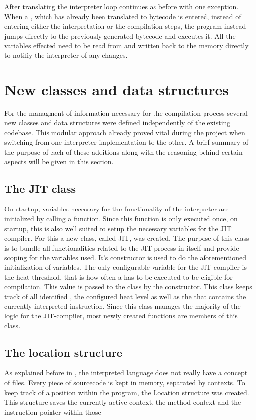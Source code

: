 After translating the interpreter loop continues as before with one exception. When a \bb{}, which has already been translated to bytecode is entered, instead of entering either the interpretation or the compilation steps, the program instead jumps directly to the previously generated bytecode and executes it. All the variables effected need to be read from and written back to the memory directly to notifiy the interpreter of any changes.

\section{New classes and data structures}
For the managment of information necessary for the compilation process several new classes and data structures were defined independently of the existing codebase. This modular approach already proved vital during the project when switching from one interpreter implementation to the other. A brief summary of the purpose of each of these additions along with the reasoning behind certain aspects will be given in this section.

\subsection{The JIT class}
On startup, variables necessary for the functionality of the interpreter are initialized by calling a function. Since this function is only executed once, on startup, this is also well suited to setup the necessary variables for the JIT compiler. 
For this a new class, called JIT, was created. The purpose of this class is to bundle all functionalities related to the JIT process in itself and provide scoping for the variables used. It's constructor is used to do the aforementioned initialization of variables. The only configurable variable for the JIT-compiler is the heat threshold, that is how often a \bb{} has to be executed to be eligible for compilation. This value is passed to the class by the constructor.
This class keeps track of all identified \bbs{}, the configured heat level as well as the \bb{} that contains the currently interpreted instruction.
Since this class manages the majority of the logic for the JIT-compiler, most newly created functions are members of this class. 

\subsection{The location structure}
As explained before in , the interpreted language does not really have a concept of files. Every piece of sourcecode is kept in memory, separated by contexts. 
To keep track of a position within the program, the Location structure was created. This structure saves the currently active context, the method context and the instruction pointer within those.

